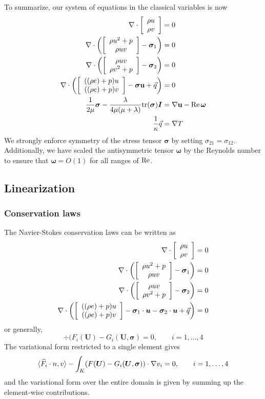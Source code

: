 To summarize, our system of equations in the classical variables is now
\begin{align*}
\div \vecttwo{\rho u }{\rho v} &= 0\\
\div \left(\vecttwo{\rho u^2+p }{\rho u v} - \boldsymbol \sigma_{1}\right) &=0\\
\div \left(\vecttwo{\rho u v}{\rho v^2+p } - \boldsymbol \sigma_{2}\right) &=0\\
\div \left(\vecttwo{((\rho e)+p)u}{((\rho e)+p)v} - \boldsymbol\sigma \mathbf{u} + \vec{q}\right) &=0\\
\frac{1}{2\mu} \boldsymbol \sigma - \frac{\lambda}{4\mu (\mu + \lambda)} { \rm tr}(\boldsymbol \sigma) \boldsymbol I &= \grad \mathbf{u} - \Reyn \, {\boldsymbol \omega}\\
\frac{1}{\kappa}\vec{q} &= \grad T
\end{align*}
We strongly enforce symmetry of the stress tensor $\boldsymbol \sigma$ by setting $\sigma_{21} = \sigma_{12}$. Additionally, we have scaled the antisymmetric tensor $\boldsymbol \omega$ by the Reynolds number to ensure that $\boldsymbol \omega = O(1)$ for all ranges of $\Reyn$.  

\subsection{Linearization}

\subsubsection{Conservation laws}

The Navier-Stokes conservation laws can be written as 
\begin{align*}
\div \vecttwo{\rho u }{\rho v} &= 0\\
\div \left(\vecttwo{\rho u^2+p }{\rho u v} - \boldsymbol \sigma_{1}\right) &=0\\
\div \left(\vecttwo{\rho u v}{\rho v^2+p } - \boldsymbol \sigma_{2}\right) &=0\\
\div \left(\vecttwo{((\rho e)+p)u}{((\rho e)+p)v} - \boldsymbol \sigma_1 \cdot \boldsymbol u- \boldsymbol \sigma_2 \cdot \boldsymbol u + \vec{q}\right) &=0\\
\end{align*}
or generally, 
\[
\div (F_i(\boldsymbol U)-G_i(\boldsymbol U,\boldsymbol \sigma) = 0, \qquad i = 1,\ldots, 4
\]
The variational form restricted to a single element gives
\[
\langle \widehat{F}_i\cdot n, v\rangle - \int_K  (F(\boldsymbol U)-G_i(\boldsymbol U,\boldsymbol \sigma)) \cdot \grad v_i = 0 , \qquad i = 1,\ldots, 4
\]
and the variational form over the entire domain is given by summing up the element-wise contributions. 

